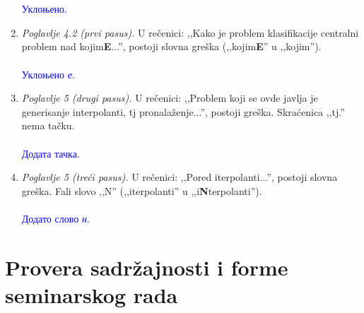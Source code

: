 \documentclass[a4paper]{report}
\newcommand{\odgovor}[1]{\textcolor{blue}{#1}}
\begin{document}
\begin{enumerate}
    \\\\
    \odgovor{Уклоњено.} 
	\\
	\item \textit{Poglavlje 4.2 (prvi pasus).} U rečenici: ,,Kako je problem klasifikacije centralni problem nad kojim\textbf{E}...'', postoji slovna greška (,,kojim\textbf{E}'' u ,,kojim'').
    \\\\
    \odgovor{Уклоњено \emph{е}.} 
	\\
	\item \textit{Poglavlje 5 (drugi pasus).} U rečenici: ,,Problem koji se ovde javlja je generisanje interpolanti, tj pronalaženje...'', postoji greška. Skraćenica ,,tj.'' nema tačku.
    \\\\
    \odgovor{Додата тачка.} 
	\\    
	\item \textit{Poglavlje 5 (treći pasus).} U rečenici: ,,Pored iterpolanti...'', postoji slovna greška. Fali slovo ,,N'' (,,iterpolanti'' u ,,i\textbf{N}terpolanti'').
    \\\\
    \odgovor{Додато слово \emph{н}.} 
	\\
\end{enumerate}


\section{Provera sadržajnosti i forme seminarskog rada}
\end{document}
